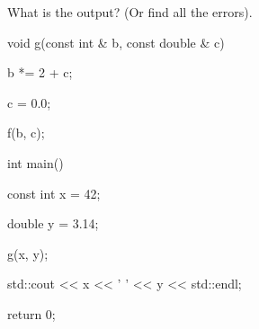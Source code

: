 What is the output? (Or find all the errors).



\begin{consolethree}[escapeinside=||]

void g(const int & b, const double & c)

{

    b *= 2 + c;

    c = 0.0;

    f(b, c);

}



int main()

{

    const int x = 42;

    double y = 3.14;

    g(x, y);

    std::cout << x << ' ' << y << std::endl;

    return 0;

}

\end{consolethree}

